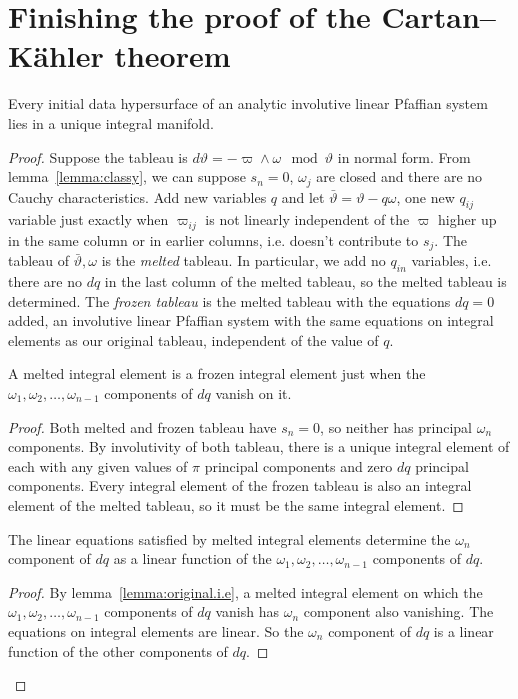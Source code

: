 \section{Finishing the proof of the Cartan--K\"ahler theorem}
\begin{lemma}
Every initial data hypersurface of an analytic involutive linear Pfaffian system lies in a unique integral manifold.
\end{lemma}
\begin{proof}
Suppose the tableau is \(d\vartheta=-\varpi \wedge \omega \mod{\vartheta}\) in normal form.
From lemma~\vref{lemma:classy}, we can suppose \(s_n=0\), \(\omega_j\) are closed and there are no Cauchy characteristics.
Add new variables \(q\) and let \(\bar\vartheta=\vartheta-q\omega\), one new \(q_{ij}\) variable just exactly when \(\varpi_{ij}\) is not linearly independent of the \(\varpi\) higher up in the same column or in earlier columns, i.e. doesn't contribute to \(s_j\).
The tableau of \(\bar\vartheta,\omega\) is the \emph{melted} tableau.
In particular, we add no \(q_{in}\) variables, i.e. there are no \(dq\) in the last column of the melted tableau, so the melted tableau is determined.
The \emph{frozen tableau} is the melted tableau with the equations \(dq=0\) added, an involutive linear Pfaffian system with the same equations on integral elements as our original tableau, independent of the value of \(q\).

\begin{lemma}\label{lemma:original.i.e}
A melted integral element is a frozen integral element just when the \(\omega_1,\omega_2,\dots,\omega_{n-1}\) components of \(dq\) vanish on it.
\end{lemma}
\begin{proof}
Both melted and frozen tableau have \(s_n=0\), so neither has principal \(\omega_n\) components.
By involutivity of both tableau, there is a unique integral element of each with any given values of \(\pi\) principal components and zero \(dq\) principal components.
Every integral element of the frozen tableau is also an integral element of the melted tableau, so it must be the same integral element.
\end{proof}

\begin{lemma}
The linear equations satisfied by melted integral elements determine the \(\omega_n\) component of \(dq\) as a linear function of the \(\omega_1, \omega_2, \dots, \omega_{n-1}\) components of \(dq\).
\end{lemma}
\begin{proof}
By lemma~\vref{lemma:original.i.e}, a melted integral element on which the \(\omega_1, \omega_2, \dots, \omega_{n-1}\) components of \(dq\) vanish has \(\omega_n\) component also vanishing.
The equations on integral elements are linear.
So the \(\omega_n\) component of \(dq\) is a linear function of the other components of \(dq\).
\end{proof}


\end{proof}
